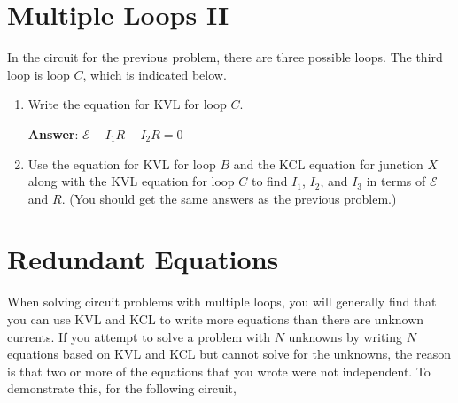 \documentclass{article}
\begin{document}
\section{Multiple Loops II}

In the circuit for the previous problem, there are three possible loops. The third loop is loop $C$, which is indicated below.



\begin{enumerate}

  \item Write the equation for KVL for loop $C$.

        \ifsolutions
        \textbf{Answer}: $\mathcal{E}-I_1R-I_2R=0$
        \else
        \vskip 36pt
        \fi

  \item Use the equation for KVL for loop $B$ and the KCL equation for junction $X$ along with the KVL equation for loop $C$ to find $I_1$, $I_2$, and $I_3$ in terms of $\mathcal{E}$ and $R$. (You should get the same answers as the previous problem.)

\end{enumerate}

\ifsolutions

\else

\newpage
\fi

\section{Redundant Equations}

When solving circuit problems with multiple loops, you will generally find that you can use KVL and KCL to write more equations than there are unknown currents. If you attempt to solve a problem with $N$ unknowns by writing $N$ equations based on KVL and KCL but cannot solve for the unknowns, the reason is that two or more of the equations that you wrote were not independent. To demonstrate this, for the following circuit,


\end{document}

